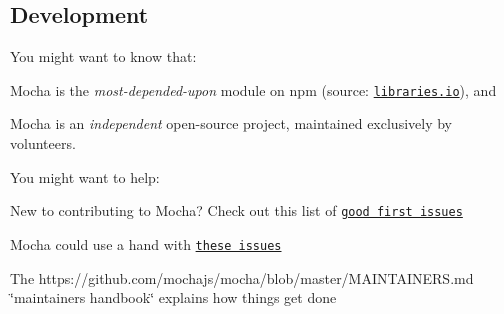 \href{https://opencollective.com/mochajs/sponsor/0/website}{\tt } \href{https://opencollective.com/mochajs/sponsor/1/website}{\tt } \href{https://opencollective.com/mochajs/sponsor/2/website}{\tt } \href{https://opencollective.com/mochajs/sponsor/3/website}{\tt } \href{https://opencollective.com/mochajs/sponsor/4/website}{\tt } \href{https://opencollective.com/mochajs/sponsor/5/website}{\tt } \href{https://opencollective.com/mochajs/sponsor/6/website}{\tt } \href{https://opencollective.com/mochajs/sponsor/7/website}{\tt } \href{https://opencollective.com/mochajs/sponsor/8/website}{\tt } \href{https://opencollective.com/mochajs/sponsor/9/website}{\tt } \href{https://opencollective.com/mochajs/sponsor/10/website}{\tt } \href{https://opencollective.com/mochajs/sponsor/11/website}{\tt } \href{https://opencollective.com/mochajs/sponsor/12/website}{\tt } \href{https://opencollective.com/mochajs/sponsor/13/website}{\tt } \href{https://opencollective.com/mochajs/sponsor/14/website}{\tt } \href{https://opencollective.com/mochajs/sponsor/15/website}{\tt } \href{https://opencollective.com/mochajs/sponsor/16/website}{\tt } \href{https://opencollective.com/mochajs/sponsor/17/website}{\tt } \href{https://opencollective.com/mochajs/sponsor/18/website}{\tt } \href{https://opencollective.com/mochajs/sponsor/19/website}{\tt }

\subsection*{Development}

You might want to know that\+:


\begin{DoxyItemize}
\item Mocha is the {\itshape most-\/depended-\/upon} module on npm (source\+: \href{https://libraries.io/search?order=desc&platforms=NPM&sort=dependents_count}{\tt libraries.\+io}), and
\item Mocha is an {\itshape independent} open-\/source project, maintained exclusively by volunteers.
\end{DoxyItemize}

You might want to help\+:


\begin{DoxyItemize}
\item New to contributing to Mocha? Check out this list of \href{https://github.com/mochajs/mocha/issues?q=is%3Aissue+is%3Aopen+label%3Agood-first-issue}{\tt good first issues}
\item Mocha could use a hand with \href{https://github.com/mochajs/mocha/issues?q=is%3Aissue+is%3Aopen+label%3A%22help+wanted%22}{\tt these issues}
\item The https\+://github.com/mochajs/mocha/blob/master/\+M\+A\+I\+N\+T\+A\+I\+N\+E\+R\+S.\+md \char`\"{}maintainer\textquotesingle{}s handbook\char`\"{} explains how things get done
\end{DoxyItemize}

